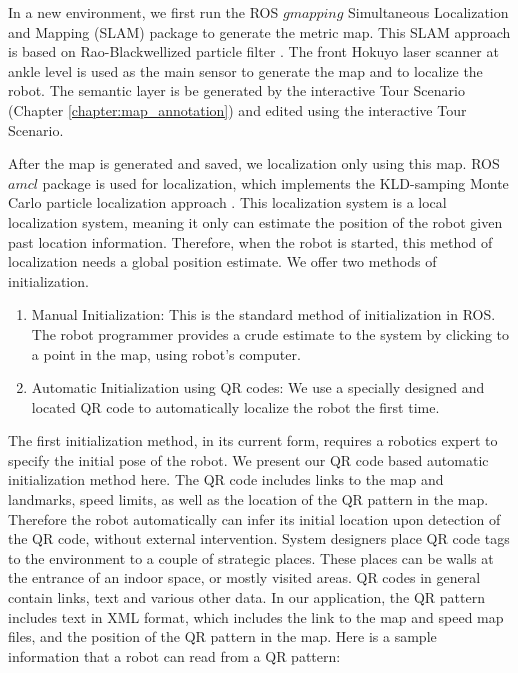 In a new environment, we first run the ROS $gmapping$ Simultaneous Localization and Mapping (SLAM) package to generate the metric map. This SLAM approach is based on Rao-Blackwellized particle filter \cite{grisetti2007improved}. The front Hokuyo laser scanner at ankle level is used as the main sensor to generate the map and to localize the robot. The semantic layer is be generated by the interactive Tour Scenario (Chapter \ref{chapter:map_annotation}) and edited using the interactive Tour Scenario.

After the map is generated and saved, we localization only using this map. ROS $amcl$ package is used for localization, which implements the KLD-samping Monte Carlo particle localization approach \cite{fox1999monte}. This localization system is a local localization system, meaning it only can estimate the position of the robot given past location information. Therefore, when the robot is started, this method of localization needs a global position estimate. We offer two methods of initialization.

\begin{enumerate}
\item Manual Initialization: This is the standard method of initialization in ROS. The robot programmer provides a crude estimate to the system by clicking to a point in the map, using robot's computer.
\item Automatic Initialization using QR codes: We use a specially designed and located QR code to automatically localize the robot the first time.
\end{enumerate}

The first initialization method, in its current form, requires a robotics expert to specify the initial pose of the robot. We present our QR code based automatic initialization method here. The QR code includes links to the map and landmarks, speed limits, as well as the location of the QR pattern in the map. Therefore the robot automatically can infer its initial location upon detection of the QR code, without external intervention. System designers place QR code tags to the environment to a couple of strategic places. These places can be walls at the entrance of an indoor space, or mostly visited areas. QR codes in general contain links, text and various other data. In our application, the QR pattern includes text in XML format, which includes the link to the map and speed map files, and the position of the QR pattern in the map. Here is a sample information that a robot can read from a QR pattern:


